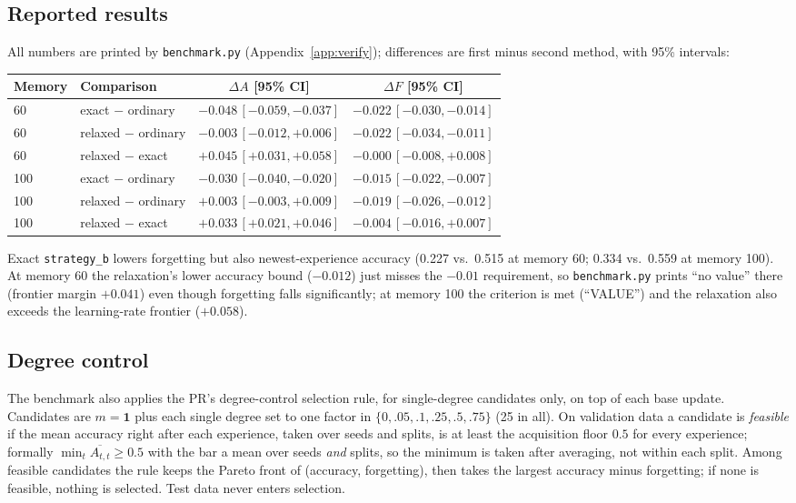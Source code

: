 \documentclass[11pt,a4paper]{article}
\newcommand{\code}[1]{\texttt{#1}}
\begin{document}
\subsection{Reported results}

All numbers are printed by \code{benchmark.py} (Appendix~\ref{app:verify}); differences are first minus second method, with 95\% intervals:
\begin{center}\scriptsize\setlength{\tabcolsep}{3pt}
\begin{tabular}{@{}llcc@{}}
\toprule
Memory & Comparison & $\Delta A$ [95\% CI] & $\Delta F$ [95\% CI]\\
\midrule
60 & exact $-$ ordinary & $-0.048\,[-0.059,-0.037]$ & $-0.022\,[-0.030,-0.014]$\\
60 & relaxed $-$ ordinary & $-0.003\,[-0.012,+0.006]$ & $-0.022\,[-0.034,-0.011]$\\
60 & relaxed $-$ exact & $+0.045\,[+0.031,+0.058]$ & $-0.000\,[-0.008,+0.008]$\\
100 & exact $-$ ordinary & $-0.030\,[-0.040,-0.020]$ & $-0.015\,[-0.022,-0.007]$\\
100 & relaxed $-$ ordinary & $+0.003\,[-0.003,+0.009]$ & $-0.019\,[-0.026,-0.012]$\\
100 & relaxed $-$ exact & $+0.033\,[+0.021,+0.046]$ & $-0.004\,[-0.016,+0.007]$\\
\bottomrule
\end{tabular}
\end{center}
Exact \code{strategy\_b} lowers forgetting but also newest-experience accuracy (0.227 vs.\ 0.515 at memory 60; 0.334 vs.\ 0.559 at memory 100). At memory 60 the relaxation's lower accuracy bound ($-0.012$) just misses the $-0.01$ requirement, so \code{benchmark.py} prints ``no value'' there (frontier margin $+0.041$) even though forgetting falls significantly; at memory 100 the criterion is met (``VALUE'') and the relaxation also exceeds the learning-rate frontier ($+0.058$).

\subsection{Degree control}

The benchmark also applies the PR's degree-control selection rule, for single-degree candidates only, on top of each base update. Candidates are $m=\mathbf 1$ plus each single degree set to one factor in $\{0,.05,.1,.25,.5,.75\}$ (25 in all). On validation data a candidate is \emph{feasible} if the mean accuracy right after each experience, taken over seeds and splits, is at least the acquisition floor $0.5$ for every experience; formally $\min_t\overline{A_{t,t}}\ge0.5$ with the bar a mean over seeds \emph{and} splits, so the minimum is taken after averaging, not within each split. Among feasible candidates the rule keeps the Pareto front of (accuracy, forgetting), then takes the largest accuracy minus forgetting; if none is feasible, nothing is selected. Test data never enters selection.
\end{document}
